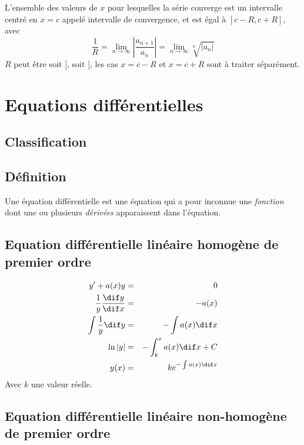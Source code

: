 L'ensemble des valeurs de $x$ pour lesquelles la série converge est
un intervalle centré en $x = c$ appelé intervalle de convergence,
 et est égal à $[c - R, c + R]$, avec
\[ \frac{1}{R} = \lim_{n \to \infty} \left| \frac{a_{n + 1}}{a_n} \right|
  = \lim_{n \to \infty} \sqrt[n]{|a_n|} \]
$R$ peut être soit $[$, soit $]$,
les cas $x = c - R$ et $x = c + R$ sont à traiter séparément.


\section{Equations différentielles}
\subsection{Classification}

\subsection{Définition}
Une équation différentielle est une équation qui a pour inconnue une
\emph{fonction} dont une ou plusieurs
\emph{dérivées} apparaissent dans l'équation.
\subsection[Linéaire homogène de premier ordre]
{Equation différentielle linéaire homogène de premier ordre}
\begin{eqnarray*}
  y' +a(x)y &=& 0\\
  \frac{1}{y}\frac{\dif y}{\dif x} &=& -a(x)\\
  \int{ \frac{1}{y} \dif y}&=& - \int{a(x) \dif x}\\
  \ln{|y|} &=& - \int_k^x{a(x) \dif x} + C\\
  y(x) &=& ke^{-\int{a(x) \dif x}}
\end{eqnarray*}
Avec $k$ une valeur réelle.

\subsection[Linéaire non-homogène de premier ordre]
{Equation différentielle linéaire non-homogène de premier ordre}
